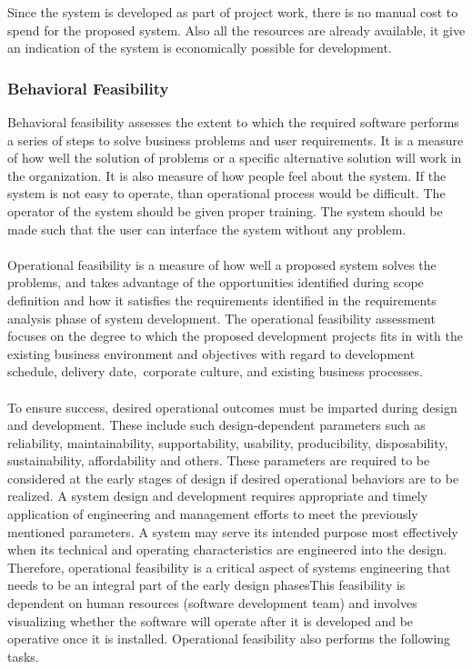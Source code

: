 Since the system is developed as part of project work, there is no manual cost to spend for the proposed system. Also all the resources are already available, it give an indication of the system is economically possible for development.

\subsubsection{Behavioral Feasibility}
Behavioral feasibility assesses the extent to which the required software performs a series of steps to solve business problems and user requirements. It is a measure of how well the solution of problems or a specific alternative solution will work in the organization. It is also measure of how people feel about the system. If the system is not easy to operate, than operational process would be difficult. The operator of the system should be given proper training. The system should be made such that the user can interface the system without any problem.\\\\

Operational feasibility is a measure of how well a proposed system solves the problems, and takes advantage of the opportunities identified during scope definition and how it satisfies the requirements identified in the requirements analysis phase of system development. The operational feasibility assessment focuses on the degree to which the proposed development projects fits in with the existing business environment and objectives with regard to development schedule, delivery date, corporate culture, and existing business processes.\\\\

To ensure success, desired operational outcomes must be imparted during design and development. These include such design-dependent parameters such as reliability, maintainability, supportability, usability, producibility, disposability, sustainability, affordability and others. These parameters are required to be considered at the early stages of design if desired operational behaviors are to be realized. A system design and development requires appropriate and timely application of engineering and management efforts to meet the previously mentioned parameters. A system may serve its intended purpose most effectively when its technical and operating characteristics are engineered into the design. Therefore, operational feasibility is a critical aspect of systems engineering that needs to be an integral part of the early design phasesThis feasibility is dependent on human resources (software development team) and involves visualizing whether the software will operate after it is developed and be operative once it is installed. Operational feasibility also performs the following tasks.\\\\

